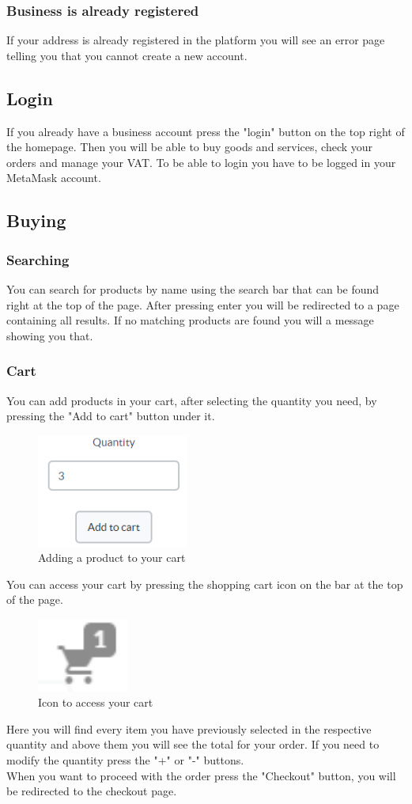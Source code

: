 	\subsubsection{Business is already registered}
	If your address is already registered in the platform you will see an
	error page telling you that you cannot create a new account.
	\subsection{Login}
	If you already have a business account press the "login" button on the 
	top right of the homepage. Then you will be able to buy goods and services, 
	check your orders and manage your VAT. To be able to login you have to be 
	logged in your MetaMask account.
	\subsection{Buying}
	\subsubsection{Searching}
	You can search for products by name using the search bar that can be found 
	right at the top of the page. After pressing enter you will be redirected to
	a page containing all results. If no matching products are found you will 
	a message showing you that.
	\subsubsection{Cart}
	You can add products in your cart, after selecting the quantity you need, 
	by pressing the "Add to cart" button under it. \\
	\begin{figure}[H]
		\includegraphics[width=5cm]{res/images/add_to_cart.png}
		\centering
		\caption{Adding a product to your cart}
	\end{figure}
	\noindent You can access your cart by pressing the shopping cart icon on the bar at 
	the top of the page.
	\begin{figure}[H]
		\includegraphics[width=3cm]{res/images/cart_icon.png}
		\centering
		\caption{Icon to access your cart}
	\end{figure}
	\noindent Here you will find every item you have previously selected in the 
	respective quantity and above them you will see the total for your order.
	If you need to modify the quantity press the "+" or "-" buttons. \\
	When you want to proceed with the order press the "Checkout" button, 
	you will be redirected to the checkout page.
